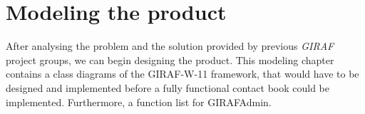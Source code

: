 \chapter{Modeling the product}
After analysing the problem and the solution provided by previous \emph{GIRAF} project groups, we can begin designing the product.
This modeling chapter contains a class diagrams of the GIRAF-W-11 framework, that would have to be designed and implemented before a fully functional contact book could be implemented. Furthermore, a function list for GIRAFAdmin.
